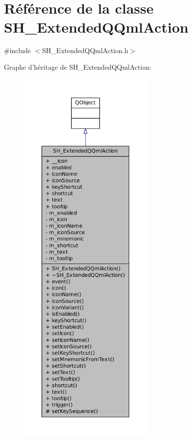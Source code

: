 \hypertarget{classSH__ExtendedQQmlAction}{\section{Référence de la classe S\-H\-\_\-\-Extended\-Q\-Qml\-Action}
\label{classSH__ExtendedQQmlAction}
}


{\ttfamily \#include $<$S\-H\-\_\-\-Extended\-Q\-Qml\-Action.\-h$>$}



Graphe d'héritage de S\-H\-\_\-\-Extended\-Q\-Qml\-Action\-:
\nopagebreak
\begin{figure}[H]
\begin{center}
\leavevmode
\includegraphics[height=550pt]{classSH__ExtendedQQmlAction__inherit__graph}
\end{center}
\end{figure}


